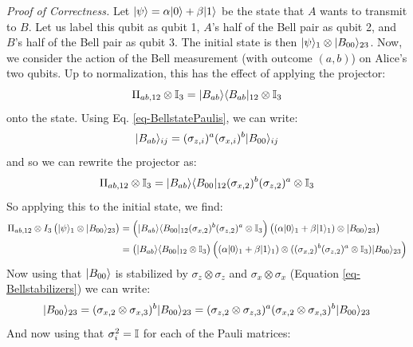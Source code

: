 \noindent
\textit{Proof of Correctness.} Let $\lvert \psi \rangle = \alpha\lvert 0 \rangle + \beta\lvert 1 \rangle$ be the state that $A$ wants to transmit to $B$. Let us label this qubit as qubit 1, $A$'s half of the Bell pair as qubit 2, and $B$'s half of the Bell pair as qubit 3. The initial state is then $\lvert \psi \rangle_1 \otimes \lvert B_{00} \rangle_{23}$. Now, we consider the action of the Bell measurement (with outcome $(a, b)$) on Alice's two qubits. Up to normalization, this has the effect of applying the projector:
\begin{equation}
    \Pi_{ab, 12} \otimes \mathbb{I}_3 = \lvert B_{ab} \rangle \langle B_{ab} \rvert_{12} \otimes \mathbb{I}_3
\end{equation}
onto the state. Using Eq. \eqref{eq-BellstatePaulis}, we can write:
\begin{equation}
    \lvert B_{ab} \rangle_{ij} = (\sigma_{z, i})^a(\sigma_{x, i})^b\lvert B_{00} \rangle_{ij}
\end{equation}
and so we can rewrite the projector as:
\begin{equation}
    \Pi_{ab, 12} \otimes \mathbb{I}_3 = \lvert B_{ab} \rangle \langle B_{00} \rvert_{12}(\sigma_{x, 2})^b(\sigma_{z, 2})^a \otimes \mathbb{I}_3
\end{equation}
So applying this to the initial state, we find:
\begin{equation}\label{eq-qteleportpart1}
    \begin{split}
        \Pi_{ab, 12} \otimes I_3\left(\lvert \psi \rangle_1 \otimes \lvert B_{00} \rangle_{23}\right) &= \left( \lvert B_{ab} \rangle \langle B_{00} \rvert_{12}(\sigma_{x, 2})^b(\sigma_{z, 2})^a \otimes \mathbb{I}_3\right)\left((\alpha\lvert 0 \rangle_1 + \beta\lvert 1 \rangle_1) \otimes \lvert B_{00} \rangle_{23}\right)
        \\ &=  \left( \lvert B_{ab} \rangle \langle B_{00} \rvert_{12} \otimes \mathbb{I}_3\right) \left((\alpha\lvert 0 \rangle_1 + \beta\lvert 1 \rangle_1) \otimes ((\sigma_{x, 2})^b(\sigma_{z, 2})^a \otimes \mathbb{I}_3) \lvert B_{00} \rangle_{23}\right)
    \end{split}
\end{equation}
Now using that $\lvert B_{00} \rangle$ is stabilized by $\sigma_z \otimes \sigma_z$ and $\sigma_x \otimes \sigma_x$ (Equation \eqref{eq-Bellstabilizers}) we can write:
\begin{equation}
    \lvert B_{00} \rangle_{23} = (\sigma_{x, 2} \otimes \sigma_{x, 3})^b\lvert B_{00} \rangle_{23} = (\sigma_{z, 2} \otimes \sigma_{z, 3})^a(\sigma_{x, 2} \otimes \sigma_{x, 3})^b\lvert B_{00} \rangle_{23}
\end{equation} 
And now using that $\sigma_i^2 = \mathbb{I}$ for each of the Pauli matrices:
